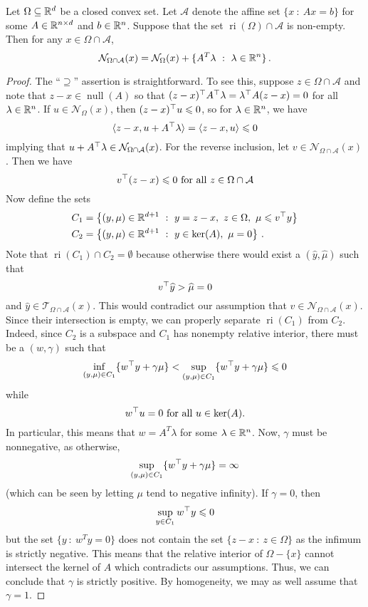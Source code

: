 \documentclass[12pt]{article}
\begin{document}
\begin{proposition}\label{prop:normal-cone-intersection}
Let $\Omega \subseteq \mathbb{R}^d$ be a closed convex set.  Let $\mathcal{A}$ denote the affine set $\{x~:~Ax = b\}$ for some $A \in \mathbb{R}^{n \times d}$ and $b \in \mathbb{R}^n$.  Suppose that the set $\operatorname{ri}(\Omega) \cap \mathcal{A}$ is non-empty. Then for any $x \in \Omega \cap \mathcal{A}$,
$$\mathcal{N}_{\Omega \cap \mathcal{A}} (x)= \mathcal{N}_{\Omega}(x) + \{A^T \lambda~:~\lambda \in \mathbb{R}^n\}\,.$$
\end{proposition}

\begin{proof}
The ``$\supseteq$'' assertion is straightforward.  To see this, suppose $z \in \Omega \cap \mathcal{A}$ and note that $z-x \in \operatorname{null}(A)$ so that $(z-x)^\top A^\top \lambda = \lambda^\top A(z-x) = 0$ for all $\lambda \in \mathbb{R}^n$. If $u \in \mathcal{N}_{\Omega}(x)$, then $(z-x)^\top u \leqslant 0$, so for $\lambda\in \mathbb{R}^n$, we have
\[
	\langle z-x, u + A^\top \lambda \rangle = \langle z-x,u \rangle \leqslant 0
\]
implying that $u+A^\top \lambda \in \mathcal{N}_{\Omega \cap \mathcal{A}}(x)$. For the reverse inclusion, let $v \in \mathcal{N}_{\Omega \cap \mathcal{A}}(x)$.  Then we have
\[
	v^\top (z-x) \leqslant 0 \text{ for all $z \in \Omega \cap \mathcal{A}$}
\]
Now define the sets
\[
\begin{aligned}
	C_1 &=\left\{ (y,\mu) \in \mathbb{R}^{d+1}~:~ y =z-x,\,\, z\in \Omega,\,\,\mu \leqslant v^\top y\right\}\\
	C_2 &= \left\{ (y,\mu) \in \mathbb{R}^{d+1}~:~ y \in \operatorname{ker}(A),\,\,\mu = 0\right\}\,.
\end{aligned}
\]
Note that $\operatorname{ri}(C_1) \cap C_2 = \emptyset$ because otherwise there would exist a $(\hat{y},\hat{\mu})$ such that
\[
	v^\top \widehat{y} > \widehat{\mu} = 0
\]
and $\hat{y} \in \mathcal{T}_{\Omega \cap \mathcal{A}}(x)$.  This would contradict our assumption that
$v \in \mathcal{N}_{\Omega \cap \mathcal{A}}(x)$.  Since their intersection is empty, we can properly separate $\operatorname{ri}(C_1)$ from $C_2$.  Indeed, since $C_2$ is a subspace and $C_1$ has nonempty relative interior, there must be a $(w,\gamma)$ such that
\[
	\inf_{(y,\mu)\in C_1} \{ w^\top y + \gamma \mu\} <	\sup_{(y,\mu)\in C_1} \{ w^\top y + \gamma \mu\} \leqslant 0
\]
while
\[
	w^\top u = 0 \text{ for all $u \in \ker(A)$.}
\]
In particular, this means that $w=A^T \lambda$  for some $\lambda \in \mathbb{R}^n$. Now, $\gamma$ must be nonnegative, as otherwise, 
\[
	\sup_{(y,\mu)\in C_1} \{ w^\top y + \gamma \mu\} = \infty
\]
(which can be seen by letting $\mu$ tend to negative infinity).  If $\gamma=0$, then
\[
	\sup_{y \in C_1} w^\top y \leqslant 0
\]
but the set $\{y~:~w^T y = 0\}$ does not contain the set $\{z-x~:~z\in\Omega\}$ as the infimum is strictly negative.  This means that the relative interior of $\Omega -\{x\}$ cannot intersect the kernel of $A$ which contradicts our assumptions.  Thus, we can conclude that $\gamma$ is strictly positive.  By homogeneity, we may as well assume that $\gamma = 1$.


\end{proof}
\end{document}
